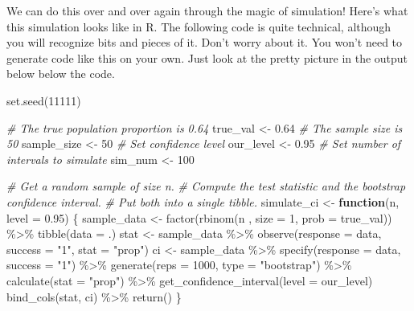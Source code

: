 \documentclass[
]{book}
\newenvironment{Shaded}{\begin{snugshade}}{\end{snugshade}}
\newcommand{\AttributeTok}[1]{\textcolor[rgb]{0.77,0.63,0.00}{#1}}
\newcommand{\CommentTok}[1]{\textcolor[rgb]{0.56,0.35,0.01}{\textit{#1}}}
\newcommand{\ControlFlowTok}[1]{\textcolor[rgb]{0.13,0.29,0.53}{\textbf{#1}}}
\newcommand{\DecValTok}[1]{\textcolor[rgb]{0.00,0.00,0.81}{#1}}
\newcommand{\FloatTok}[1]{\textcolor[rgb]{0.00,0.00,0.81}{#1}}
\newcommand{\FunctionTok}[1]{\textcolor[rgb]{0.00,0.00,0.00}{#1}}
\newcommand{\NormalTok}[1]{#1}
\newcommand{\OtherTok}[1]{\textcolor[rgb]{0.56,0.35,0.01}{#1}}
\newcommand{\SpecialCharTok}[1]{\textcolor[rgb]{0.00,0.00,0.00}{#1}}
\newcommand{\StringTok}[1]{\textcolor[rgb]{0.31,0.60,0.02}{#1}}
\begin{document}
We can do this over and over again through the magic of simulation! Here's what this simulation looks like in R. The following code is quite technical, although you will recognize bits and pieces of it. Don't worry about it. You won't need to generate code like this on your own. Just look at the pretty picture in the output below below the code.

\begin{Shaded}
\begin{Highlighting}[]
\FunctionTok{set.seed}\NormalTok{(}\DecValTok{11111}\NormalTok{)}

\CommentTok{\# The true population proportion is 0.64}
\NormalTok{true\_val }\OtherTok{\textless{}{-}} \FloatTok{0.64}
\CommentTok{\# The sample size is 50}
\NormalTok{sample\_size }\OtherTok{\textless{}{-}} \DecValTok{50}
\CommentTok{\# Set confidence level}
\NormalTok{our\_level }\OtherTok{\textless{}{-}} \FloatTok{0.95}
\CommentTok{\# Set number of intervals to simulate}
\NormalTok{sim\_num }\OtherTok{\textless{}{-}} \DecValTok{100}

\CommentTok{\# Get a random sample of size n.}
\CommentTok{\# Compute the test statistic and the bootstrap confidence interval.}
\CommentTok{\# Put both into a single tibble.}
\NormalTok{simulate\_ci }\OtherTok{\textless{}{-}} \ControlFlowTok{function}\NormalTok{(n, }\AttributeTok{level =} \FloatTok{0.95}\NormalTok{) \{}
\NormalTok{    sample\_data }\OtherTok{\textless{}{-}}
        \FunctionTok{factor}\NormalTok{(}\FunctionTok{rbinom}\NormalTok{(n , }\AttributeTok{size =} \DecValTok{1}\NormalTok{, }\AttributeTok{prob =}\NormalTok{ true\_val)) }\SpecialCharTok{\%\textgreater{}\%}
        \FunctionTok{tibble}\NormalTok{(}\AttributeTok{data =}\NormalTok{ .)}
\NormalTok{    stat }\OtherTok{\textless{}{-}}\NormalTok{ sample\_data }\SpecialCharTok{\%\textgreater{}\%}
        \FunctionTok{observe}\NormalTok{(}\AttributeTok{response =}\NormalTok{ data, }\AttributeTok{success =} \StringTok{"1"}\NormalTok{, }\AttributeTok{stat =} \StringTok{"prop"}\NormalTok{)}
\NormalTok{    ci }\OtherTok{\textless{}{-}}\NormalTok{ sample\_data }\SpecialCharTok{\%\textgreater{}\%}
        \FunctionTok{specify}\NormalTok{(}\AttributeTok{response =}\NormalTok{ data, }\AttributeTok{success =} \StringTok{"1"}\NormalTok{) }\SpecialCharTok{\%\textgreater{}\%}
        \FunctionTok{generate}\NormalTok{(}\AttributeTok{reps =} \DecValTok{1000}\NormalTok{, }\AttributeTok{type =} \StringTok{"bootstrap"}\NormalTok{) }\SpecialCharTok{\%\textgreater{}\%}
        \FunctionTok{calculate}\NormalTok{(}\AttributeTok{stat =} \StringTok{"prop"}\NormalTok{) }\SpecialCharTok{\%\textgreater{}\%}
        \FunctionTok{get\_confidence\_interval}\NormalTok{(}\AttributeTok{level =}\NormalTok{ our\_level)}
    \FunctionTok{bind\_cols}\NormalTok{(stat, ci) }\SpecialCharTok{\%\textgreater{}\%}
        \FunctionTok{return}\NormalTok{()}
\NormalTok{\}}


\end{Highlighting}
\end{Shaded}
\end{document}
